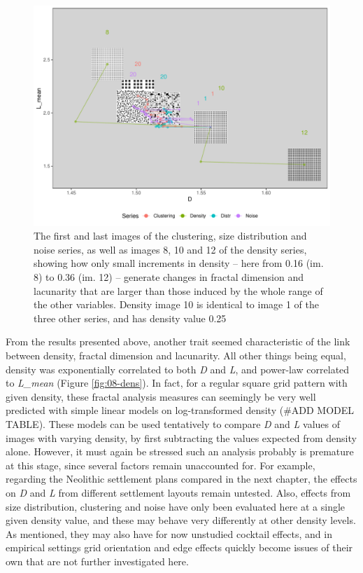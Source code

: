 \documentclass[
  12pt,
]{book}
\begin{document}
\begin{figure}
\hypertarget{fig:08-all-im}{%
\centering
\includegraphics{Results/fig08_all_im.pdf}
\caption{The first and last images of the clustering, size distribution and noise series, as well as images 8, 10 and 12 of the density series, showing how only small increments in density -- here from 0.16 (im. 8) to 0.36 (im. 12) -- generate changes in fractal dimension and lacunarity that are larger than those induced by the whole range of the other variables. Density image 10 is identical to image 1 of the three other series, and has density value 0.25}\label{fig:08-all-im}
}
\end{figure}

From the results presented above, another trait seemed characteristic of the link between density, fractal dimension and lacunarity. All other things being equal, density was exponentially correlated to both \emph{D} and \emph{L}, and power-law correlated to \emph{L\_mean} (Figure \ref{fig:08-dens}). In fact, for a regular square grid pattern with given density, these fractal analysis measures can seemingly be very well predicted with simple linear models on log-transformed density (\#ADD MODEL TABLE). These models can be used tentatively to compare \emph{D} and \emph{L} values of images with varying density, by first subtracting the values expected from density alone. However, it must again be stressed such an analysis probably is premature at this stage, since several factors remain unaccounted for. For example, regarding the Neolithic settlement plans compared in the next chapter, the effects on \emph{D} and \emph{L} from different settlement layouts remain untested. Also, effects from size distribution, clustering and noise have only been evaluated here at a single given density value, and these may behave very differently at other density levels. As mentioned, they may also have for now unstudied cocktail effects, and in empirical settings grid orientation and edge effects quickly become issues of their own that are not further investigated here.
\end{document}
